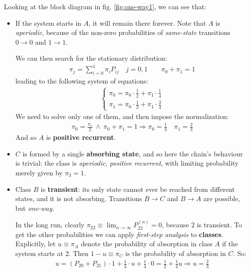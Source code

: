 \documentclass[../template.tex]{subfiles}
\begin{document}
Looking at the block diagram in fig. \ref{fig:one-way1}, we can see that:
\begin{itemize}
    \item If the system starts in $A$, it will remain there forever. Note that $A$ is \textit{aperiodic}, because of the non-zero probabilities of \textit{same-state} transitions $0 \to 0$ and $1\to 1$.
      
    We can then search for the stationary distribution:
    \begin{align*}
        \pi_j = \sum_{i=0}^1 \pi_i P_{ij} \quad j = 0,1 \qquad \pi_0 + \pi_1 = 1
    \end{align*}
    leading to the following system of equations:
    \begin{align*}
        \begin{cases}
            \pi_0 = \pi_0 \cdot  \frac{1}{2}  + \pi_1 \cdot \frac{1}{4} \\
            \pi_1 = \pi_0 \cdot \frac{1}{2} + \pi_1 \cdot \frac{3}{4}  
        \end{cases}
    \end{align*}
    We need to solve only one of them, and then impose the normalization:
    \begin{align*}
        \pi_0 = \frac{\pi_1}{2}  \> \land \> \pi_0 + \pi_1 = 1 \Rightarrow \pi_0 = \frac{1}{3} \quad \pi_1 = \frac{2}{3}  
    \end{align*}
    And so $A$ is \textbf{positive recurrent}. 
    \item $C$ is formed by a single \textbf{absorbing state}, and so here the chain's behaviour is trivial: the class is \textit{aperiodic}, \textit{positive recurrent}, with limiting probability merely given by $\pi_3 = 1$.   
    \item Class $B$ is \textbf{transient}: its only state cannot ever be reached from different states, and it is not absorbing. Transitions $B \to C$ and $B \to A$ are possible, but \textit{one-way}. 
    
    In the long run, clearly $\pi_{2 2} \equiv \lim_{n \to \infty} P_{22}^{(n)} = 0$, because $2$ is transient. To get the other probabilities we can apply \textit{first-step analysis} to \textbf{classes}. Explicitly, let $u \equiv \pi_A$ denote the probability of absorption in class $A$ if the system starts at $2$. Then $1-u \equiv \pi_C$ is the probability of absorption in $C$. So:
    \begin{align*}
        u = (P_{20} + P_{21}) \cdot 1 + \frac{1}{4} \cdot u + \frac{1}{4} \cdot 0 = \frac{1}{2} + \frac{1}{4}u \Rightarrow u=\frac{2}{3}     
    \end{align*}


\end{itemize}
\end{document}
